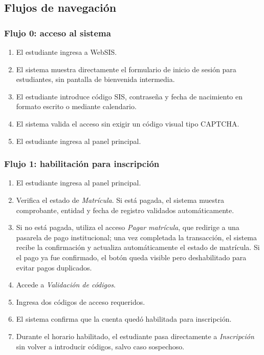\subsection{Flujos de navegación}

\subsubsection*{Flujo 0: acceso al sistema}

\begin{enumerate}
  \item El estudiante ingresa a WebSIS.
  \item El sistema muestra directamente el formulario de inicio de sesión para estudiantes, sin pantalla de bienvenida intermedia.
  \item El estudiante introduce código SIS, contraseña y fecha de nacimiento en formato escrito o mediante calendario.
  \item El sistema valida el acceso sin exigir un código visual tipo CAPTCHA.
  \item El estudiante ingresa al panel principal.
\end{enumerate}

\subsubsection*{Flujo 1: habilitación para inscripción}

\begin{enumerate}
  \item El estudiante ingresa al panel principal.
  \item Verifica el estado de \textit{Matrícula}. Si está pagada, el sistema muestra comprobante, entidad y fecha de registro validados automáticamente.
  \item Si no está pagada, utiliza el acceso \textit{Pagar matrícula}, que redirige a una pasarela de pago institucional; una vez completada la transacción, el sistema recibe la confirmación y actualiza automáticamente el estado de matrícula. Si el pago ya fue confirmado, el botón queda visible pero deshabilitado para evitar pagos duplicados.
  \item Accede a \textit{Validación de códigos}.
  \item Ingresa dos códigos de acceso requeridos.
  \item El sistema confirma que la cuenta quedó habilitada para inscripción.
  \item Durante el horario habilitado, el estudiante pasa directamente a \textit{Inscripción} sin volver a introducir códigos, salvo caso sospechoso.
\end{enumerate}

